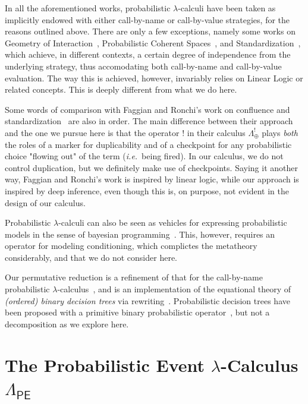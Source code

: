 \documentclass[runningheads,orivec]{llncs}
\theoremstyle{definition}
\theoremstyle{plain}
\newcommand{\ie}{\textit{i.e.}}
\newcommand\PEL{\Lambda_{\textsf{PE}}}
\newcommand\+[1][{}]{\kern1pt{\smallbin\oplus}_{#1}\kern1pt}
\newcommand\1{\bullet}
\newcommand\0{\circ}
\begin{document}
In all the aforementioned works, probabilistic $\lambda$-calculi have been taken as implicitly endowed with either call-by-name or call-by-value strategies, for the reasons outlined above. There are only a few exceptions, namely some works on Geometry of Interaction~\cite{DLFVY17}, Probabilistic Coherent Spaces~\cite{EhrhardTasson19}, and Standardization~\cite{FaggianRonchi19}, which achieve, in different contexts, a certain degree of independence from the underlying strategy, thus accomodating both call-by-name and call-by-value evaluation. The way this is achieved, however, invariably relies on Linear Logic or related concepts. This is deeply different from what we do here.

Some words of comparison with Faggian and Ronchi's work on confluence and standardization~\cite{FaggianRonchi19} are also in order. The main difference between their approach and the one we pursue here is that the operator $!$ in their calculus $\Lambda_\oplus^!$ plays \emph{both} the roles of a marker for duplicability and of a checkpoint for any probabilistic choice "flowing out" of the term (\ie\ being fired). In our calculus, we do not control duplication, but we definitely make use of checkpoints. Saying it another way, Faggian and Ronchi's work is inspired by linear logic, while our approach is inspired by deep inference, even though this is, on purpose, not evident in the design of our calculus. 

Probabilistic $\lambda$-calculi can also be seen as vehicles for expressing probabilistic models in the sense of bayesian programming~\cite{Ramsey-Pfeffer-2002,BDLGS16}. This, however, requires an operator for modeling conditioning, which complictes the metatheory considerably, and that we do not consider here.

Our permutative reduction is a refinement of that for the call-by-name probabilistic $\lambda$-calculus~\cite{Leventis19}, and is an implementation of the equational theory of \emph{(ordered) binary decision trees} via rewriting~\cite{Zantema-Pol-2001}. Probabilistic decision trees have been proposed with a primitive binary probabilistic operator~\cite{Manber-Tompa-1982}, but not a decomposition as we explore here.



\section{\texorpdfstring{The Probabilistic Event $\lambda$-Calculus $\PEL$}{The Probabilistic Event Lambda-Calculus PEL}}
\label{sec:PEL}
\end{document}
